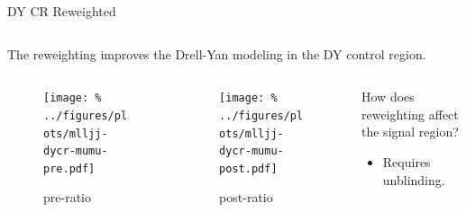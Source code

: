 \documentclass[aspectratio=169]{beamer}
\begin{document}
\begin{frame}{DY CR Reweighted}
  \begin{columns}
    \begin{column}{0.69\textwidth}
      \begin{block}{}
        \centering
        The reweighting improves the Drell-Yan modeling in the DY control region.
      \end{block}
    \end{column}
    \begin{column}{0.3\textwidth}
      \centering
      \resizebox{0.9\columnwidth}{!}{%
      
      }
    \end{column}
  \end{columns}
  \begin{columns}
    \begin{column}{0.35\textwidth}
      \begin{figure}
        \texttt{[image: \%
        ../figures/plots/mlljj-dycr-mumu-pre.pdf]}
        \caption{pre-ratio}
      \end{figure}
    \end{column}
    \begin{column}{0.35\textwidth}
      \begin{figure}
        \texttt{[image: \%
        ../figures/plots/mlljj-dycr-mumu-post.pdf]}
        \caption{post-ratio}
      \end{figure}
    \end{column}
    \begin{column}{0.3\textwidth}
      \begin{block}{}
        How does reweighting affect the signal region?
          \begin{itemize}
            \footnotesize
            \item Requires unblinding.
          \end{itemize}
      \end{block}
    \end{column}
  \end{columns}
\end{frame}
\end{document}
